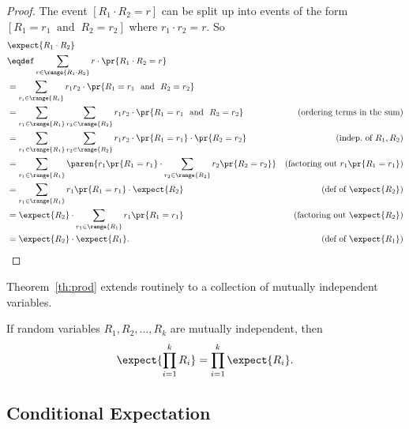 \begin{proof}
The event $[R_1 \cdot R_2=r]$ can be split up into events of the form
$[R_1 = r_1\ \text{ and }\ R_2 = r_2]$ where $r_1\cdot r_2=r$.  So
\begin{align*}
\lefteqn{\expect{R_1 \cdot R_2}}\\
& \eqdef \sum_{r \in \range{R_1\cdot R_2}} r\cdot \pr{R_1\cdot R_2=r}\\
\iffalse
& =      \sum_{\scriptsize \begin{aligned}
                       r_1 \in \range{R_1},\\
                       r_2 \in \range{R_2}
                      \end{aligned}}\fi
& =      \sum_{r_i \in \range{R_i}}
            r_1 r_2 \cdot \pr{R_1=r_1\ \text{ and }\ R_2=r_2}\\
& =      \sum_{r_1 \in \range{R_1}} \sum_{r_2 \in \range{R_2}}
            r_1 r_2 \cdot \pr{R_1=r_1\ \text{ and }\ R_2=r_2}
                    &\text{(ordering terms in the sum)}\\
& =      \sum_{r_1 \in \range{R_1}} \sum_{r_2 \in \range{R_2}}
            r_1 r_2 \cdot \pr{R_1=r_1}\cdot \pr{R_2=r_2}
                    &\text{(indep.\ of $R_1,R_2$)}\\
& =      \sum_{r_1 \in \range{R_1}} \paren{r_1\pr{R_1=r_1} \cdot
              \sum_{r_2 \in \range{R_2}} r_2 \pr{R_2=r_2}}
                    &\text{(factoring out $r_1\pr{R_1=r_1}$)}\\
& =      \sum_{r_1 \in \range{R_1}} r_1\pr{R_1=r_1} \cdot \expect{R_2}
                    &\text{(def of $\expect{R_2}$)}\\
& =       \expect{R_2} \cdot \sum_{r_1 \in \range{R_1}} r_1\pr{R_1=r_1}
                    &\text{(factoring out $\expect{R_2}$)}\\
& =       \expect{R_2} \cdot  \expect{R_1}.
                    &\text{(def of $\expect{R_1}$)}
\end{align*}

\end{proof}

Theorem~\ref{th:prod} extends routinely to a collection of mutually
independent variables.
\begin{corollary}
If random variables $R_1, R_2, \dots, R_k$ are mutually
independent, then
\[
\expect{\prod_{i=1}^k R_i} = \prod_{i=1}^k \expect{R_i}.
\]
\end{corollary}


\subsection{Conditional Expectation}

